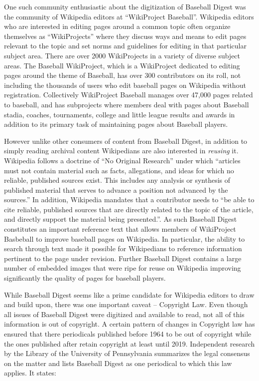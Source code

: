 \documentclass[12pt]{article}
\begin{document}
One such community enthusiastic about the digitization of Baseball Digest was the community of Wikipedia editors at ``WikiProject Baseball''. Wikipedia editors who are interested in editing pages around a common topic often organize themselves as ``WikiProjects'' where they discuss ways and means to edit pages relevant to the topic and set norms and guidelines for editing in that particular subject area. There are over 2000 WikiProjects in a variety of diverse subject areas. The Baseball WikiProject, which is a WikiProject dedicated to editing pages around the theme of Baseball, has over 300 contributors on its roll, not including the thousands of users who edit baseball pages on Wikipedia without registration. Collectively WikiProject Baseball manages over 47,000 pages related to baseball, and has subprojects where members deal with pages about Baseball stadia, coaches, tournaments, college and little league results and awards in addition to its primary task of maintaining pages about Baseball players. 

However unlike other consumers of content from Baseball Digest, in addition to simply reading archival content Wikipedians are also interested in \emph{reusing} it. Wikipedia follows a doctrine of ``No Original Research'' under which ``articles must not contain material such as facts, allegations, and ideas for which no reliable, published sources exist. This includes any analysis or synthesis of published material that serves to advance a position not advanced by the sources.'' In addition, Wikipedia mandates that a contributor needs to ``be able to cite reliable, published sources that are directly related to the topic of the article, and directly support the material being presented.''. As such Baseball Digest constitutes an important reference text that allows members of WikiProject Basbeball to improve baseball pages on Wikipedia. In particular, the ability to search through text made it possible for Wikipedians to reference information pertinent to the page under revision. Further Baseball Digest contains a large number of embedded images that were ripe for reuse on Wikipedia improving significantly the quality of pages for baseball players. 

While Baseball Digest seems like a prime candidate for Wikipedia editors to draw and build upon, there was one important caveat -- Copyright Law. Even though  all issues of Baseball Digest were digitized and available to read, not all of this information is out of copyright. A certain pattern of changes in Copyright law has ensured that there periodicals published before 1964 to be out of copyright while the ones published after retain copyright at least until 2019. Independent research by the Library of the University of Pennsylvania summarizes the legal consensus on the matter and lists Baseball Digest as one periodical to which this law applies. It states: 
\end{document}
